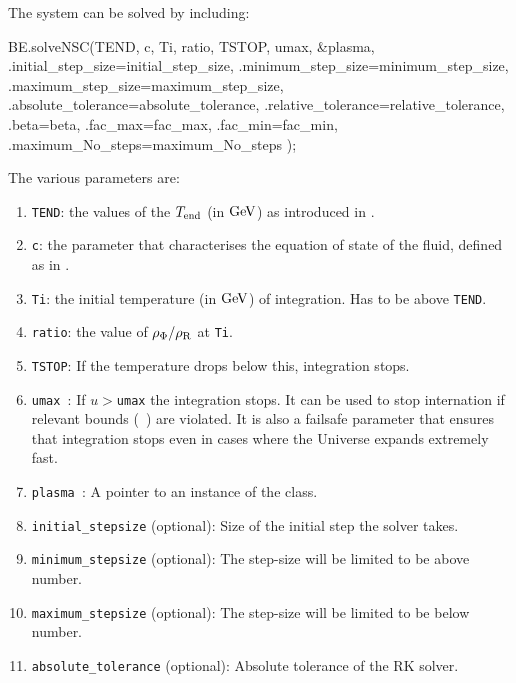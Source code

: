 \documentclass[11pt,a4paper]{article}
\begin{document}
The system can be solved by including:
%
\begin{cpp}
	BE.solveNSC(TEND, c, Ti, ratio, TSTOP, umax, &plasma,
				 	 {
					 .initial_step_size=initial_step_size, .minimum_step_size=minimum_step_size,
					 .maximum_step_size=maximum_step_size, .absolute_tolerance=absolute_tolerance, 
					 .relative_tolerance=relative_tolerance, .beta=beta, 
					 .fac_max=fac_max, .fac_min=fac_min, .maximum_No_steps=maximum_No_steps
					 }
					);
\end{cpp}
%
The various parameters are:
%
\begin{enumerate}
	\item {\tt TEND}: the values of the $T_{\rm end}{}$ (in ${\rm GeV}$) as introduced in . 
	
	\item {\tt c}: the parameter that characterises the equation of state of the fluid, defined as in .
	
	\item {\tt Ti}: the initial temperature (in ${\rm GeV}$) of integration. Has to be above {\tt TEND}.
	
	\item {\tt ratio}: the value of $\rho_{\Phi}/\rho_{\rm R}$ at {\tt Ti}. 
	
	\item {\tt TSTOP}: If the temperature drops below this, integration stops. 
	
	\item {\tt umax }: If $u>${\tt umax} the integration stops. It can be used to stop internation if relevant bounds (\eg~\cite{Planck:2018jri}) are violated. It is also a failsafe parameter that ensures that integration stops even in cases where the Universe expands extremely fast.
	
	\item {\tt plasma }: A pointer to an instance of the  class.
	
	\item {\tt initial\_stepsize} (optional): Size of the initial step the solver takes. 
	
	\item {\tt minimum\_stepsize} (optional): The step-size will be limited to be above number. 
	
	\item {\tt maximum\_stepsize} (optional): The step-size will be limited to be below number. 
	
	\item {\tt absolute\_tolerance} (optional): Absolute tolerance of the RK solver.
	

\end{enumerate}
\end{document}

